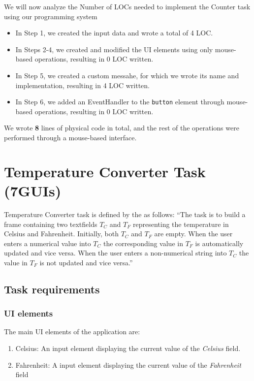 We will now analyze the Number of LOCs needed to implement the Counter task using our programming system
\begin{itemize}
	\item In Step 1, we created the input data and wrote a total of 4 LOC.
	\item   In Steps 2-4, we created and modified the UI elements using only mouse-based operations, resulting in 0 LOC written.
	\item   In Step 5, we created a custom messahe, for which we wrote its name and implementation, resulting in 4 LOC written.
	\item   In Step 6, we added an EventHandler to the \texttt{button} element through mouse-based operations, resulting in 0 LOC written.
\end{itemize}
\noindent We wrote \textbf{8} lines of physical code in total, and the rest of the operations were performed through a mouse-based interface.







\clearpage
\section{Temperature Converter Task (7GUIs)}
Temperature Converter task is defined by the \citet{7GUIs-web} as follows: ``The task is to build a frame containing two textfields $T_C$ and $T_F$ representing the temperature in Celsius and Fahrenheit. Initially, both $T_C$ and $T_F$ are empty.
When the user enters a numerical value into $T_C$ the corresponding value in $T_F$ is automatically updated and vice versa. When the user enters a non-numerical string into $T_C$ the value in $T_F$ is not updated and vice versa.''
\medskip
\subsection{Task requirements}
\subsubsection{UI elements}
The main UI elements of the application are:
\begin{enumerate}
	\item Celsius: An input element displaying the current value of the \emph{Celsius} field.
	\item Fahrenheit: A input element displaying the current value of the \emph{Fahrenheit} field
\end{enumerate}

